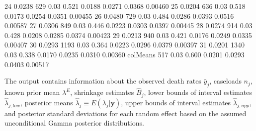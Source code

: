 \documentclass[article]{jss}
\begin{document}
\begin{CodeChunk}
\begin{CodeOutput}
24         0.0238  629       0.03     0.521   0.0188    0.0271   0.0368 0.00460
25         0.0204  636       0.03     0.518   0.0173    0.0254   0.0351 0.00455
26         0.0480  729       0.03     0.484   0.0286    0.0393   0.0516 0.00587
27         0.0306  849       0.03     0.446   0.0223    0.0303   0.0397 0.00445
28         0.0274  914       0.03     0.428   0.0208    0.0285   0.0374 0.00423
29         0.0213  940       0.03     0.421   0.0176    0.0249   0.0335 0.00407
30         0.0293 1193       0.03     0.364   0.0223    0.0296   0.0379 0.00397
31         0.0201 1340       0.03     0.338   0.0170    0.0235   0.0310 0.00360
colMeans           517       0.03     0.600   0.0201    0.0293   0.0403 0.00517
\end{CodeOutput}
\end{CodeChunk}

The output contains information about the observed death rates $\bar{y}_{j}$, caseloads $n_{j}$, known prior mean $\lambda^E$, shrinkage estimates $\hat{B}_{j}$, lower bounds of interval estimates $\hat{\lambda}_{j, low}$, posterior means $\hat{\lambda}_j\equiv E(\lambda_{j}\vert \boldsymbol{y})$, upper bounds  of interval estimates $\hat{\lambda}_{j, upp}$, and posterior standard deviations  for each random effect based on the assumed unconditional Gamma posterior distributions. %

\end{document}
